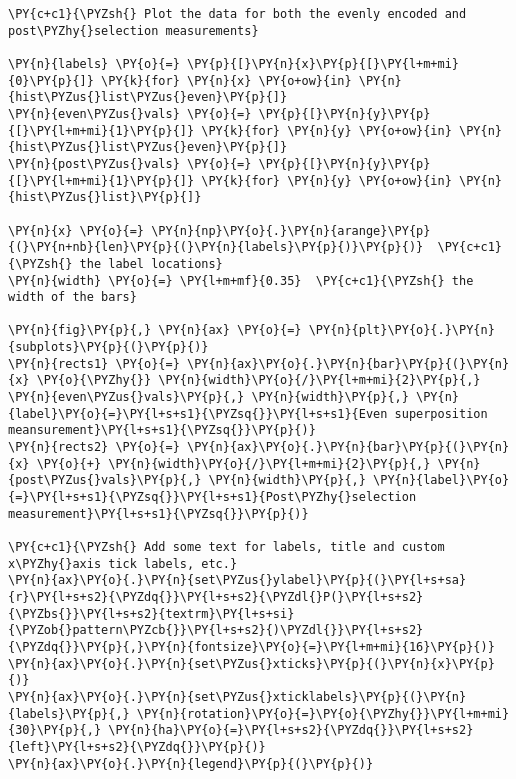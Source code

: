     \begin{tcolorbox}[breakable, size=fbox, boxrule=1pt, pad at break*=1mm,colback=cellbackground, colframe=cellborder]
\begin{Verbatim}[commandchars=\\\{\}]
\PY{c+c1}{\PYZsh{} Plot the data for both the evenly encoded and post\PYZhy{}selection measurements}

\PY{n}{labels} \PY{o}{=} \PY{p}{[}\PY{n}{x}\PY{p}{[}\PY{l+m+mi}{0}\PY{p}{]} \PY{k}{for} \PY{n}{x} \PY{o+ow}{in} \PY{n}{hist\PYZus{}list\PYZus{}even}\PY{p}{]}
\PY{n}{even\PYZus{}vals} \PY{o}{=} \PY{p}{[}\PY{n}{y}\PY{p}{[}\PY{l+m+mi}{1}\PY{p}{]} \PY{k}{for} \PY{n}{y} \PY{o+ow}{in} \PY{n}{hist\PYZus{}list\PYZus{}even}\PY{p}{]}
\PY{n}{post\PYZus{}vals} \PY{o}{=} \PY{p}{[}\PY{n}{y}\PY{p}{[}\PY{l+m+mi}{1}\PY{p}{]} \PY{k}{for} \PY{n}{y} \PY{o+ow}{in} \PY{n}{hist\PYZus{}list}\PY{p}{]}

\PY{n}{x} \PY{o}{=} \PY{n}{np}\PY{o}{.}\PY{n}{arange}\PY{p}{(}\PY{n+nb}{len}\PY{p}{(}\PY{n}{labels}\PY{p}{)}\PY{p}{)}  \PY{c+c1}{\PYZsh{} the label locations}
\PY{n}{width} \PY{o}{=} \PY{l+m+mf}{0.35}  \PY{c+c1}{\PYZsh{} the width of the bars}

\PY{n}{fig}\PY{p}{,} \PY{n}{ax} \PY{o}{=} \PY{n}{plt}\PY{o}{.}\PY{n}{subplots}\PY{p}{(}\PY{p}{)}
\PY{n}{rects1} \PY{o}{=} \PY{n}{ax}\PY{o}{.}\PY{n}{bar}\PY{p}{(}\PY{n}{x} \PY{o}{\PYZhy{}} \PY{n}{width}\PY{o}{/}\PY{l+m+mi}{2}\PY{p}{,} \PY{n}{even\PYZus{}vals}\PY{p}{,} \PY{n}{width}\PY{p}{,} \PY{n}{label}\PY{o}{=}\PY{l+s+s1}{\PYZsq{}}\PY{l+s+s1}{Even superposition meansurement}\PY{l+s+s1}{\PYZsq{}}\PY{p}{)}
\PY{n}{rects2} \PY{o}{=} \PY{n}{ax}\PY{o}{.}\PY{n}{bar}\PY{p}{(}\PY{n}{x} \PY{o}{+} \PY{n}{width}\PY{o}{/}\PY{l+m+mi}{2}\PY{p}{,} \PY{n}{post\PYZus{}vals}\PY{p}{,} \PY{n}{width}\PY{p}{,} \PY{n}{label}\PY{o}{=}\PY{l+s+s1}{\PYZsq{}}\PY{l+s+s1}{Post\PYZhy{}selection measurement}\PY{l+s+s1}{\PYZsq{}}\PY{p}{)}

\PY{c+c1}{\PYZsh{} Add some text for labels, title and custom x\PYZhy{}axis tick labels, etc.}
\PY{n}{ax}\PY{o}{.}\PY{n}{set\PYZus{}ylabel}\PY{p}{(}\PY{l+s+sa}{r}\PY{l+s+s2}{\PYZdq{}}\PY{l+s+s2}{\PYZdl{}P(}\PY{l+s+s2}{\PYZbs{}}\PY{l+s+s2}{textrm}\PY{l+s+si}{\PYZob{}pattern\PYZcb{}}\PY{l+s+s2}{)\PYZdl{}}\PY{l+s+s2}{\PYZdq{}}\PY{p}{,}\PY{n}{fontsize}\PY{o}{=}\PY{l+m+mi}{16}\PY{p}{)}
\PY{n}{ax}\PY{o}{.}\PY{n}{set\PYZus{}xticks}\PY{p}{(}\PY{n}{x}\PY{p}{)}
\PY{n}{ax}\PY{o}{.}\PY{n}{set\PYZus{}xticklabels}\PY{p}{(}\PY{n}{labels}\PY{p}{,} \PY{n}{rotation}\PY{o}{=}\PY{o}{\PYZhy{}}\PY{l+m+mi}{30}\PY{p}{,} \PY{n}{ha}\PY{o}{=}\PY{l+s+s2}{\PYZdq{}}\PY{l+s+s2}{left}\PY{l+s+s2}{\PYZdq{}}\PY{p}{)}
\PY{n}{ax}\PY{o}{.}\PY{n}{legend}\PY{p}{(}\PY{p}{)}


\end{Verbatim}
\end{tcolorbox}
